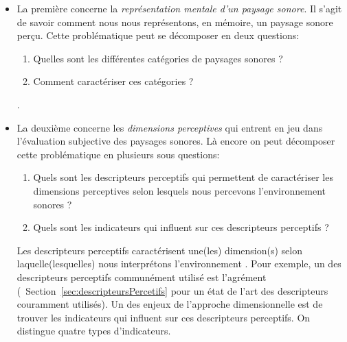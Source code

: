 \begin{itemize}
\item La première concerne la \emph{représentation mentale d'un paysage sonore}. Il s'agit de savoir comment nous nous représentons, en mémoire, un paysage sonore perçu. Cette problématique peut se décomposer en deux questions:
\begin{enumerate}
\item Quelles sont les différentes catégories de paysages sonores ?
\item Comment caractériser ces catégories ?
\end{enumerate}

.

\item La deuxième concerne les \emph{dimensions perceptives} qui entrent en jeu dans l'évaluation subjective des paysages sonores. Là encore on peut décomposer cette problématique en plusieurs sous questions:
\begin{enumerate}
\item Quels sont les descripteurs perceptifs qui permettent de caractériser les dimensions perceptives selon lesquels nous percevons l'environnement sonores ? 
\item Quels sont les indicateurs qui influent sur ces descripteurs perceptifs ?
\end{enumerate}

 Les descripteurs perceptifs caractérisent une(les) dimension(s) selon laquelle(lesquelles) nous interprétons l'environnement . Pour exemple, un des descripteurs perceptifs communément utilisé est l'agrément (\Cf~Section~\ref{sec:descripteursPercetifs} pour un état de l'art des descripteurs couramment utilisés). 
Un des enjeux de l'approche dimensionnelle est de trouver les indicateurs qui influent sur ces descripteurs perceptifs. 
On distingue quatre types d'indicateurs.


\end{itemize}
